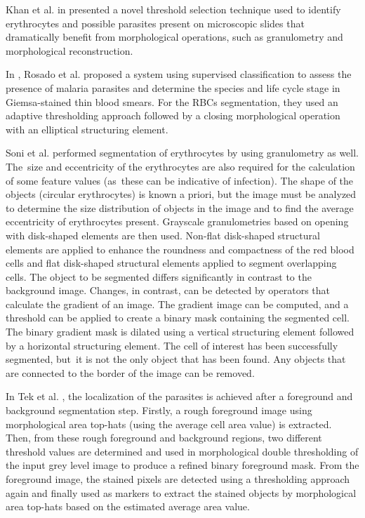 \documentclass[final,a4paper,12pt,english]{UnicaPhdThesis3}
\begin{document}
Khan et al. in \cite{Khan2011} presented a novel threshold selection technique used to identify erythrocytes and possible parasites present on microscopic slides that dramatically benefit from morphological operations, such as granulometry and morphological reconstruction.

In \cite{Rosado2017}, Rosado et al. proposed a system using supervised classification to assess the presence of malaria parasites and determine the species and life cycle stage in Giemsa-stained thin blood smears. For the RBCs segmentation, they used an adaptive thresholding approach followed by a closing morphological operation with an elliptical structuring element.

Soni et al. \cite{Soni2011} performed segmentation of erythrocytes by using granulometry as well. The~size and eccentricity of the erythrocytes are also required for the calculation of some feature values (as~these can be indicative of infection). The shape of the objects (circular erythrocytes) is known a priori, but the image must be analyzed to determine the size distribution of objects in the image and to find the average eccentricity of erythrocytes present.
Grayscale granulometries based on opening with disk-shaped elements are then used. Non-flat disk-shaped structural elements are applied to enhance the roundness and compactness of the red blood cells and flat disk-shaped structural elements applied to segment overlapping cells. The object to be segmented differs significantly in contrast to the background image. Changes, in contrast, can be detected by operators that calculate the gradient of an image. The gradient image can be computed, and a threshold can be applied to create a binary mask containing the segmented cell. The binary gradient mask is dilated using a vertical structuring element followed by a horizontal structuring element. The cell of interest has been successfully segmented, but~it is not the only object that has been found. Any objects that are connected to the border of the image can be removed.

In Tek et al. \cite{Tek2010}, the localization of the parasites is achieved after a foreground and background segmentation step. Firstly, a rough foreground image using morphological area top-hats (using the average cell area value) is extracted. Then, from these rough foreground and background regions, two different threshold values are determined and used in morphological double thresholding of the input grey level image to produce a refined binary foreground mask. From the foreground image, the stained pixels are detected using a thresholding approach again and finally used as markers to extract the stained objects by morphological area top-hats based on the estimated average area value.
\end{document}
